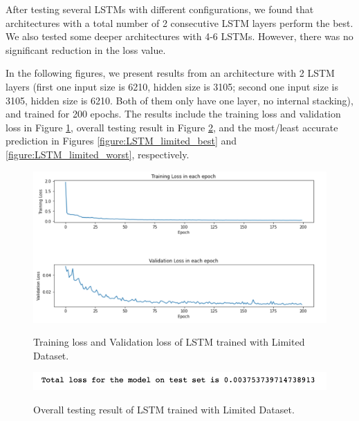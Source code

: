 After testing several LSTMs with different configurations, we found that architectures with a total number of 2 consecutive LSTM layers perform the best. We also tested some deeper architectures with 4-6 LSTMs. However, there was no significant reduction in the loss value.

In the following figures, we present results from an architecture with 2 LSTM layers (first one input size is 6210, hidden size is 3105; second one input size is 3105, hidden size is 6210. Both of them only have one layer, no internal stacking), and trained for 200 epochs. The results include the training loss and validation loss in Figure \ref{figure:LSTM_limited_losses}, overall testing result in Figure \ref{figure:LSTM_limited_testing}, and the most/least accurate prediction in Figures \ref{figure:LSTM_limited_best} and \ref{figure:LSTM_limited_worst}, respectively.

\begin{figure}[H]
    \caption{Training loss and Validation loss of LSTM trained with Limited Dataset.}
    \includegraphics[scale=0.6]{figures/mantle_convection_images/limited_dataset/LSTM_trainingData.png}
    \label{figure:LSTM_limited_losses}
\end{figure}

\begin{figure}[H]
    \caption{Overall testing result of LSTM trained with Limited Dataset.}
    \includegraphics[scale=0.8]{figures/mantle_convection_images/limited_dataset/LSTM_OverallTesting.png}
    \label{figure:LSTM_limited_testing}
\end{figure}

